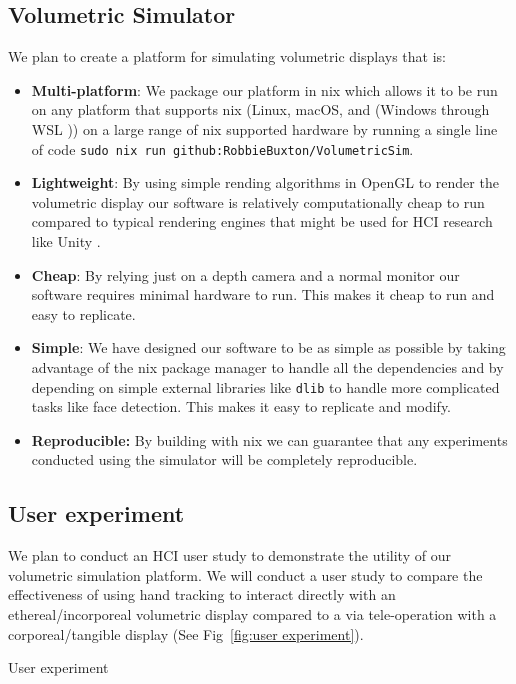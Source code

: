 \subsection{Volumetric Simulator}
We plan to create a platform for simulating volumetric displays that is:
\begin{itemize}
    \item \textbf{Multi-platform}: We package our platform in nix \cite{dolstra2004nix} which allows it to be run on any platform that supports nix  (Linux, macOS, and (Windows through WSL \tocite)) on a large range of nix supported hardware \tocite by running a single line of code \texttt{sudo nix run github:RobbieBuxton/VolumetricSim}.
    
    \item \textbf{Lightweight}: By using simple rending algorithms in OpenGL to render the volumetric display our software is relatively computationally cheap to run compared to typical rendering engines that might be used for HCI research like Unity \tocite. 
    
    \item \textbf{Cheap}: By relying just on a depth camera and a normal monitor our software requires minimal hardware to run. This makes it cheap to run and easy to replicate.
    
    \item \textbf{Simple}: We have designed our software to be as simple as possible by taking advantage of the nix package manager to handle all the dependencies and by depending on simple external libraries like \texttt{dlib} \tocite to handle more complicated tasks like face detection. This makes it easy to replicate and modify.
    
    \item \textbf{Reproducible:} By building with nix we can guarantee that any experiments conducted using the simulator will be completely reproducible.
\end{itemize}

\subsection{User experiment}
We plan to conduct an HCI user study to demonstrate the utility of our volumetric simulation platform. We will conduct a user study to compare the effectiveness of using hand tracking to interact directly with an ethereal/incorporeal volumetric display compared to a via tele-operation with a corporeal/tangible display (See Fig~\ref{fig:user experiment}). 

\begin{figureBox}[label={fig:user experiment}]{User experiment}
\end{figureBox}